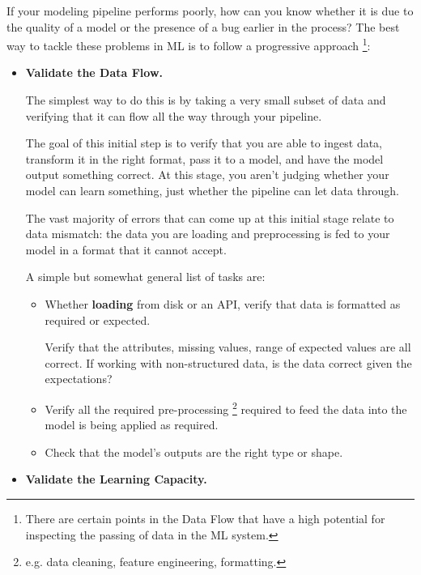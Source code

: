 If your modeling pipeline performs poorly, how can
you know whether it is due to the quality of a model
or the presence of a bug earlier in the process?
The best way to tackle these problems in ML is to
follow a progressive approach
\footnote{  
    There are certain points in the Data Flow that
    have a high potential for inspecting the passing 
    of data in the ML system.
}:
\begin{itemize}
    \item \textbf{Validate the Data Flow.}
    
    \noindent
    The simplest way to do this is by taking a very
    small subset of data and verifying that it can
    flow all the way through your pipeline.

    The goal of this initial step is to verify that
    you are able to ingest data, transform it in
    the right format, pass it to a model, and have
    the model output something correct. At this
    stage, you aren't judging whether your model
    can learn something, just whether the pipeline
    can let data through.

    The vast majority of errors that can come up at
    this initial stage relate to data mismatch: the
    data you are loading and preprocessing is fed to
    your model in a format that it cannot accept.

    A simple but somewhat general list of tasks are:
    \begin{itemize}
        \item Whether \textbf{loading} from disk or
        an API, verify that data is formatted as
        required or expected.

        Verify that the attributes, missing values,
        range of expected values are all correct.
        If working with non-structured data, is the
        data correct given the expectations?

        \item Verify all the required pre-processing
        \footnote{
            e.g. data cleaning, feature engineering,
            formatting.
        }
        required to feed the data into the model is
        being applied as required.

        \item Check that the model's outputs are the
        right type or shape.
    \end{itemize}


    \item \textbf{Validate the Learning Capacity.}
    

\end{itemize}
